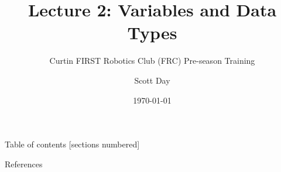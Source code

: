 \documentclass[9pt]{beamer}              %
\title{Lecture 2: Variables and Data Types}
\subtitle{Curtin FIRST Robotics Club (FRC) Pre-season Training}
\date{\today}
\author{Scott Day}
\institute{Curtin University}
\begin{document}


\maketitle

\begin{frame}{Table of contents}
  [sections numbered]
  \tableofcontents[hideallsubsections]
\end{frame}








\begin{frame}[allowframebreaks]{References}

  
  

\end{frame}

\end{document}
